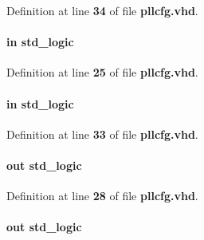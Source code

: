 Definition at line {\bf 34} of file {\bf pllcfg.\+vhd}.

\paragraph[{sdinA}]{ {\bfseries \textcolor{keywordflow}{in}\textcolor{vhdlchar}{ }} {\bfseries \textcolor{comment}{std\+\_\+logic}\textcolor{vhdlchar}{ }} \hspace{0.3cm}{\ttfamily [Port]}}\label{classpllcfg_a32ae4568fc0796a3f7dd9ba108f79156}


Definition at line {\bf 25} of file {\bf pllcfg.\+vhd}.

\paragraph[{sdinB}]{ {\bfseries \textcolor{keywordflow}{in}\textcolor{vhdlchar}{ }} {\bfseries \textcolor{comment}{std\+\_\+logic}\textcolor{vhdlchar}{ }} \hspace{0.3cm}{\ttfamily [Port]}}\label{classpllcfg_afa158f403175296212e3fa64da774b90}


Definition at line {\bf 33} of file {\bf pllcfg.\+vhd}.

\paragraph[{sdoutA}]{ {\bfseries \textcolor{keywordflow}{out}\textcolor{vhdlchar}{ }} {\bfseries \textcolor{comment}{std\+\_\+logic}\textcolor{vhdlchar}{ }} \hspace{0.3cm}{\ttfamily [Port]}}\label{classpllcfg_a1dc6f5e11071716113a4ad7698740deb}


Definition at line {\bf 28} of file {\bf pllcfg.\+vhd}.

\paragraph[{sdoutB}]{ {\bfseries \textcolor{keywordflow}{out}\textcolor{vhdlchar}{ }} {\bfseries \textcolor{comment}{std\+\_\+logic}\textcolor{vhdlchar}{ }} \hspace{0.3cm}{\ttfamily [Port]}}\label{classpllcfg_a66a0c39b8b3d13e6cc7ded78cb5176eb}


